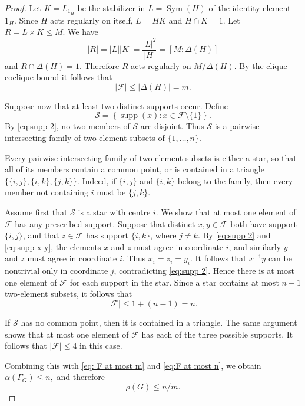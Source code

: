 \documentclass[11pt]{article}
\begin{document}
\begin{proof}
Let
$K=L_{1_H}$
be the stabilizer in \(L=\operatorname{Sym}(H)\) of the identity
element \(1_H\). Since \(H\) acts regularly on itself,
$L=HK$
and
$H\cap K=1.$
Let 
\(
R=L\times K\leq M.
\)
We have
\[
|R|
=
|L||K|
=
\frac{|L|^2}{|H|}
=
[M:\Delta(H)]
\]
and
\(
R\cap\Delta(H)=1.
\)
Therefore \(R\) acts regularly on \(M/\Delta(H)\). By the
clique-coclique bound it follows that
\begin{equation} \label{eq: F at most m}
|\mathcal{F}|\leq |\Delta(H)|=m.
\end{equation}

Suppose now that at least two distinct supports occur. Define
\[
\mathcal{S}
=
\left\{
\operatorname{supp}(x):
x\in\mathcal{F}\setminus\{1\}
\right\}.
\]
By \eqref{eq:supp 2}, no two members of \(\mathcal{S}\) are disjoint. Thus
\(\mathcal{S}\) is a pairwise intersecting family of two-element
subsets of \(\{1,\ldots,n\}\).

Every pairwise intersecting family of two-element subsets is either
a star, so that all of its members contain a common point, or is
contained in a triangle
\(
\bigl\{
\{i,j\},\{i,k\},\{j,k\}
\bigr\}.
\)
Indeed, if \(\{i,j\}\) and \(\{i,k\}\) belong to the family, then
every member not containing \(i\) must be \(\{j,k\}\).

Assume first that \(\mathcal{S}\) is a star with centre \(i\). We
show that at most one element of \(\mathcal{F}\) has any prescribed
support. Suppose that distinct \(x,y\in\mathcal{F}\) both have
support \(\{i,j\}\), and that \(z\in\mathcal{F}\) has support
\(\{i,k\}\), where \(j\neq k\).
By \eqref{eq:supp 2} and \eqref{eq:supp x y}, the elements \(x\) and \(z\) must agree in coordinate
\(i\), and similarly \(y\) and \(z\) must agree in coordinate \(i\).
Thus
\(
x_i=z_i=y_i.
\)
It follows that \(x^{-1}y\) can be nontrivial only in coordinate
\(j\), contradicting \eqref{eq:supp 2}. Hence there is at most one element of
\(\mathcal{F}\) for each support in the star. Since a star contains
at most \(n-1\) two-element subsets, it follows that
\begin{equation}\label{eq:F at most n}
|\mathcal{F}|
\leq 1+(n-1)
=n.
\end{equation}

If \(\mathcal{S}\) has no common point, then it is contained
in a triangle. The same argument shows that at most one element of
\(\mathcal{F}\) has each of the three possible supports. It follows that 
$|\mathcal{F}|\leq 4$ in this case.

Combining this with \eqref{eq: F at most m} and \eqref{eq:F at most n}, we obtain
\(
\alpha(\Gamma_G)\leq n,
\) and therefore 
$$\rho(G)\leq n/m.$$


\end{proof}
\end{document}
